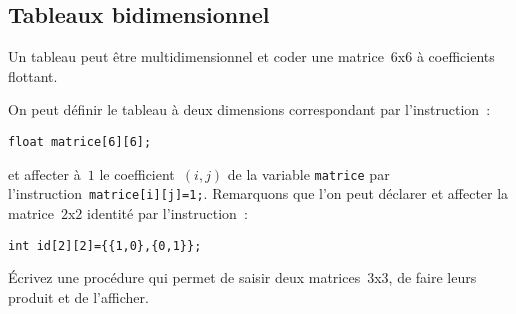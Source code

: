 \subsection{Tableaux bidimensionnel}
\label{sec:TableauMultidimensionel}
Un tableau peut  \^etre multidimensionnel et coder une matrice~$6$x$6$
\`a coefficients flottant.
\par
On  peut d\'efinir  le tableau  \`a  deux dimensions correspondant par
l'instruction~:
\begin{verbatim}
float matrice[6][6];
\end{verbatim}
et   affecter   \`a~$1$   le  coefficient~${(i,j)}$  de   la  variable
\texttt{matrice}   par     l'instruction~\texttt{matrice[i][j]=1;}.    
Remarquons  que  l'on peut d\'eclarer  et  affecter la matrice~$2$x$2$
identit\'e              par            l'instruction~:
\begin{verbatim}
int id[2][2]={{1,0},{0,1}};
\end{verbatim}
\begin{exercice}
  \'Ecrivez    une proc\'edure      qui   permet    de  saisir    deux
  matrices~$3$x$3$, de faire leurs produit et de l'afficher.
  \ifcorrection
  \begin{correction}
    
  \end{correction}
  \fi
\end{exercice}
